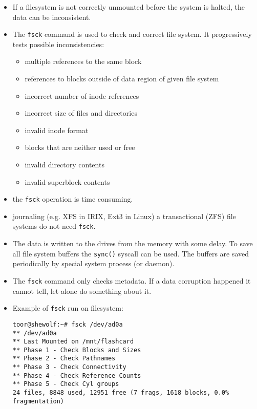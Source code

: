 \begin{slide}
\setlength{\baselineskip}{0.8\baselineskip}
\begin{itemize}
\setlength{\itemsep}{0ex}
\item If a filesystem is not correctly unmounted before the system is halted,
the data can be inconsistent.
\item The \texttt{fsck} command is used to check and correct file system.
It progressively tests possible inconsistencies:
    \begin{itemize}
    \setlength{\itemsep}{0ex}
    \item multiple references to the same block
    \item references to blocks outside of data region of given file system
    \item incorrect number of inode references
    \item incorrect size of files and directories
    \item invalid inode format
    \item blocks that are neither used or free
    \item invalid directory contents
    \item invalid superblock contents
    \end{itemize}
\item the \texttt{fsck} operation is time consuming.
\item journaling (e.g. XFS in IRIX, Ext3 in Linux) a transactional (ZFS)
file systems do not need \texttt{fsck}.
\end{itemize}
\end{slide}

\begin{itemize}
\item The data is written to the drives from the memory with some delay.
To save all file system buffers the \texttt{sync()} syscall can be used.
The buffers are saved periodically by special system process (or daemon).
\item The \texttt{fsck} command only checks metadata. If a data corruption
happened it cannot tell, let alone do something about it.
\item Example of \texttt{fsck} run on  filesystem:
\begin{verbatim}
toor@shewolf:~# fsck /dev/ad0a
** /dev/ad0a
** Last Mounted on /mnt/flashcard
** Phase 1 - Check Blocks and Sizes
** Phase 2 - Check Pathnames
** Phase 3 - Check Connectivity
** Phase 4 - Check Reference Counts
** Phase 5 - Check Cyl groups
24 files, 8848 used, 12951 free (7 frags, 1618 blocks, 0.0% fragmentation)
\end{verbatim}
\end{itemize}


